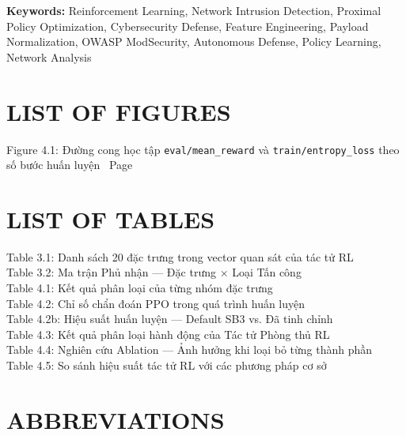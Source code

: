 \documentclass[12pt,a4paper,twoside]{report}
\begin{document}
\vspace{0.7cm}
\noindent
\textbf{Keywords:} Reinforcement Learning, Network Intrusion Detection, Proximal Policy Optimization, Cybersecurity Defense, Feature Engineering, Payload Normalization, OWASP ModSecurity, Autonomous Defense, Policy Learning, Network Analysis

\newpage

\tableofcontents

\newpage

\chapter*{LIST OF FIGURES}

\setlength{\parindent}{0pt}
\vspace{0.5cm}

\noindent
Figure 4.1: Đường cong học tập \texttt{eval/mean\_reward} và \texttt{train/entropy\_loss} theo số bước huấn luyện \dotfill~Page~\pageref{fig:learning_curves}

\newpage

\chapter*{LIST OF TABLES}

\setlength{\parindent}{0pt}
\vspace{0.5cm}

\noindent
Table 3.1: Danh sách 20 đặc trưng trong vector quan sát của tác tử RL \\
Table 3.2: Ma trận Phủ nhận --- Đặc trưng $\times$ Loại Tấn công \\
Table 4.1: Kết quả phân loại của từng nhóm đặc trưng \\
Table 4.2: Chỉ số chẩn đoán PPO trong quá trình huấn luyện \\
Table 4.2b: Hiệu suất huấn luyện --- Default SB3 vs. Đã tinh chỉnh \\
Table 4.3: Kết quả phân loại hành động của Tác tử Phòng thủ RL \\
Table 4.4: Nghiên cứu Ablation --- Ảnh hưởng khi loại bỏ từng thành phần \\
Table 4.5: So sánh hiệu suất tác tử RL với các phương pháp cơ sở

\newpage

\chapter*{ABBREVIATIONS}
\end{document}
